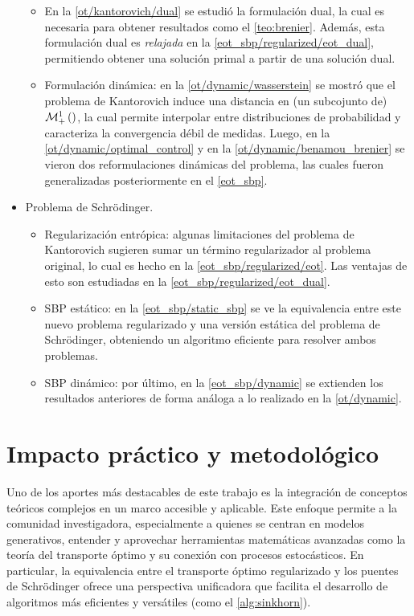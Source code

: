 \begin{itemize}
\begin{itemize}
        \item En la \autoref{ot/kantorovich/dual} se estudió la formulación dual, la cual es necesaria para obtener resultados como el \autoref{teo:brenier}. Además, esta formulación dual es \textit{relajada} en la \autoref{eot_sbp/regularized/eot_dual}, permitiendo obtener una solución primal a partir de una solución dual.
        \item Formulación dinámica: en la \autoref{ot/dynamic/wasserstein} se mostró que el problema de Kantorovich induce una distancia en (un subcojunto de) $\mathcal{M}_+^1\left(\right)$, la cual permite interpolar entre distribuciones de probabilidad y caracteriza la convergencia débil de medidas. Luego, en la \autoref{ot/dynamic/optimal_control} y en la \autoref{ot/dynamic/benamou_brenier} se vieron dos reformulaciones dinámicas del problema, las cuales fueron generalizadas posteriormente en el \autoref{eot_sbp}.
    \end{itemize}
    \item Problema de Schrödinger.
    \begin{itemize}
        \item Regularización entrópica: algunas limitaciones del problema de Kantorovich sugieren sumar un término regularizador al problema original, lo cual es hecho en la \autoref{eot_sbp/regularized/eot}. Las ventajas de esto son estudiadas en la \autoref{eot_sbp/regularized/eot_dual}.
        \item SBP estático: en la \autoref{eot_sbp/static_sbp} se ve la equivalencia entre este nuevo problema regularizado y una versión estática del problema de Schrödinger, obteniendo un algoritmo eficiente para resolver ambos problemas.
        \item SBP dinámico: por último, en la \autoref{eot_sbp/dynamic} se extienden los resultados anteriores de forma análoga a lo realizado en la \autoref{ot/dynamic}.
    \end{itemize}
\end{itemize}

\section*{Impacto práctico y metodológico}

Uno de los aportes más destacables de este trabajo es la integración de conceptos teóricos complejos en un marco accesible y aplicable. Este enfoque permite a la comunidad investigadora, especialmente a quienes se centran en modelos generativos, entender y aprovechar herramientas matemáticas avanzadas como la teoría del transporte óptimo y su conexión con procesos estocásticos. En particular, la equivalencia entre el transporte óptimo regularizado y los puentes de Schrödinger ofrece una perspectiva unificadora que facilita el desarrollo de algoritmos más eficientes y versátiles (como el \autoref{alg:sinkhorn}).

